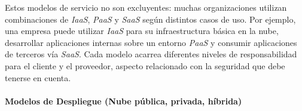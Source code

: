 \documentclass[12pt,twoside,titlepage]{report}
\begin{document}
Estos modelos de servicio no son excluyentes: muchas organizaciones utilizan combinaciones de \textit{IaaS}, \textit{PaaS} y \textit{SaaS} según distintos casos de uso. Por ejemplo, una empresa puede utilizar \textit{IaaS} para su infraestructura básica en la nube, desarrollar aplicaciones internas sobre un entorno \textit{PaaS} y consumir aplicaciones de terceros vía \textit{SaaS}. Cada modelo acarrea diferentes niveles de responsabilidad para el cliente y el proveedor, aspecto relacionado con la seguridad que debe tenerse en cuenta.

\paragraph{Modelos de Despliegue (Nube pública, privada, híbrida) \\ \\}
\end{document}
